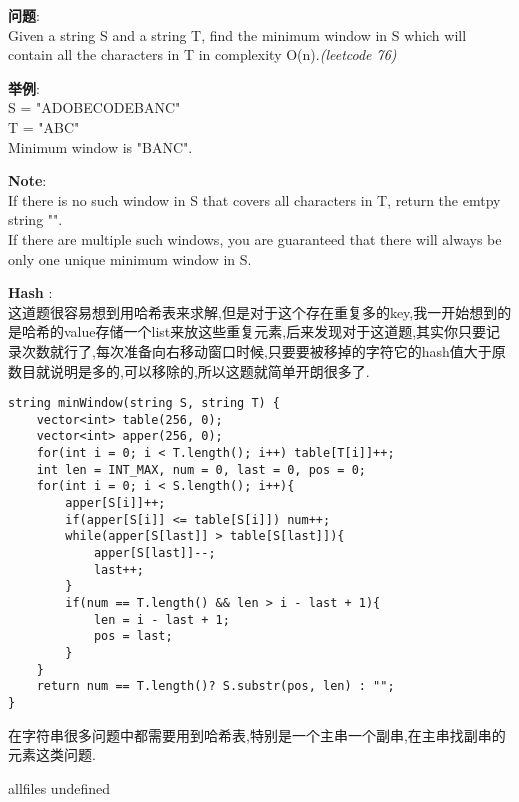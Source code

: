 \documentclass{article}
\begin{document}
\begin{CJK}{UTF8}{gbsn}     %

\else
    
\begin{description}
    \item{\textbf{问题}}: \\
	Given a string S and a string T, find the minimum window in S which will contain all the characters in T in complexity O(n).\textit{(leetcode 76)}
    \item{\textbf{举例}}: \\
	S = "ADOBECODEBANC"\\
	T = "ABC"\\
	Minimum window is "BANC".
    \item{\textbf{Note}}: \\
	If there is no such window in S that covers all characters in T, return the emtpy string "".\\
	If there are multiple such windows, you are guaranteed that there will always be only one unique minimum window in S.
    \item{\textbf{Hash}} : 
    \\这道题很容易想到用哈希表来求解,但是对于这个存在重复多的key,我一开始想到的是哈希的value存储一个list来放这些重复元素,后来发现对于这道题,其实你只要记录次数就行了,每次准备向右移动窗口时候,只要要被移掉的字符它的hash值大于原数目就说明是多的,可以移除的,所以这题就简单开朗很多了.
    \begin{lstlisting}
string minWindow(string S, string T) {
	vector<int> table(256, 0);
	vector<int> apper(256, 0);
	for(int i = 0; i < T.length(); i++) table[T[i]]++;
	int len = INT_MAX, num = 0, last = 0, pos = 0;
	for(int i = 0; i < S.length(); i++){
		apper[S[i]]++;
		if(apper[S[i]] <= table[S[i]]) num++;
		while(apper[S[last]] > table[S[last]]){
			apper[S[last]]--;
			last++;
		}
		if(num == T.length() && len > i - last + 1){
			len = i - last + 1;
			pos = last;
		}
	}
	return num == T.length()? S.substr(pos, len) : "";
}
    \end{lstlisting}
    在字符串很多问题中都需要用到哈希表,特别是一个主串一个副串,在主串找副串的元素这类问题.
\end{description}

\fi

\ifx allfiles undefined
\end{CJK}
\end{document}
